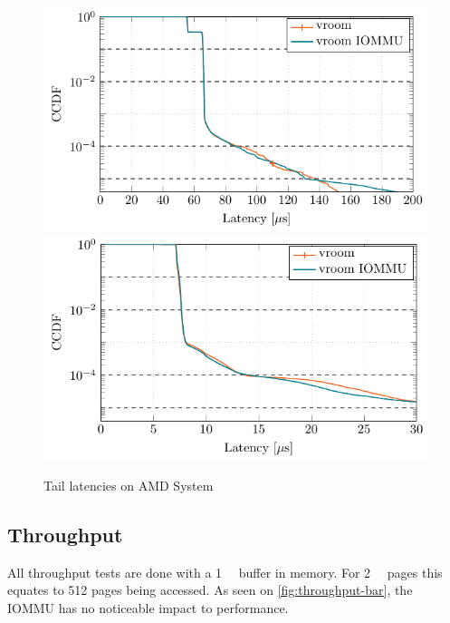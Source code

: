 \begin{figure}[H]
  \centering
   {\includegraphics[width=.70\textwidth]{figures/lats_ccdf_2MiB_qd1t1_read_epyc} \label{fig:ccdf-read-epyc}}
   {\includegraphics[width=.70\textwidth]{figures/lats_ccdf_2MiB_qd1t1_epyc} \label{fig:ccdf-write-epyc}}
  \caption{Tail latencies on AMD System}
  \label{fig:ccdf-epyc}
\end{figure}

\subsection{Throughput}
All throughput tests are done with a \qty{1}{\gibi\byte} buffer in memory. For \qty{2}{\mebi\byte} pages this equates to 512 pages being accessed. As seen on \autoref{fig:throughput-bar}, the IOMMU has no noticeable impact to performance.

